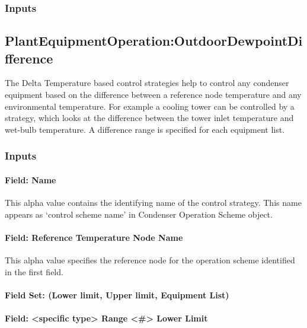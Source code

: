 \subsubsection{Inputs}\label{inputs-10-012}

\subsection{PlantEquipmentOperation:OutdoorDewpointDifference}\label{plantequipmentoperationoutdoordewpointdifference}

The Delta Temperature based control strategies help to control any condenser equipment based on the difference between a reference node temperature and any environmental temperature. For example a cooling tower can be controlled by a strategy, which looks at the difference between the tower inlet temperature and wet-bulb temperature. A difference range is specified for each equipment list.

\subsubsection{Inputs}\label{inputs-11-011}

\paragraph{Field: Name}\label{field-name-5-016}

This alpha value contains the identifying name of the control strategy. This name appears as `control scheme name' in Condenser Operation Scheme object.

\paragraph{Field: Reference Temperature Node Name}\label{field-reference-temperature-node-name}

This alpha value specifies the reference node for the operation scheme identified in the first field.

\paragraph{Field Set: (Lower limit, Upper limit, Equipment List)}\label{field-set-lower-limit-upper-limit-equipment-list}

\paragraph{Field: \textless{}specific type\textgreater{} Range \textless{}\#\textgreater{} Lower Limit}\label{field-specific-type-range-lower-limit-1}

